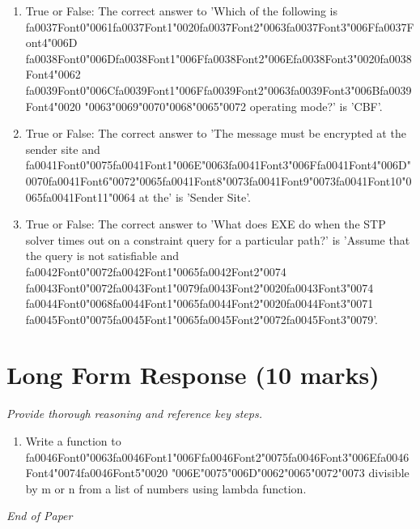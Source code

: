 \documentclass[12pt]{article}
\begin{document}
\begin{enumerate}[label=\arabic*.]
\item True or False: The correct answer to 'Which of the following is {\csname fa0037Font0\endcsname\char"0061}{\csname fa0037Font1\endcsname\char"0020}{\csname fa0037Font2\endcsname\char"0063}{\csname fa0037Font3\endcsname\char"006F}{\csname fa0037Font4\endcsname\char"006D} {\csname fa0038Font0\endcsname\char"006D}{\csname fa0038Font1\endcsname\char"006F}{\csname fa0038Font2\endcsname\char"006E}{\csname fa0038Font3\endcsname\char"0020}{\csname fa0038Font4\endcsname\char"0062} {\csname fa0039Font0\endcsname\char"006C}{\csname fa0039Font1\endcsname\char"006F}{\csname fa0039Font2\endcsname\char"0063}{\csname fa0039Font3\endcsname\char"006B}{\csname fa0039Font4\endcsname\char"0020} {\char"0063}{\char"0069}{\char"0070}{\char"0068}{\char"0065}{\char"0072} operating mode?' is 'CBF'.
\item True or False: The correct answer to 'The message must be encrypted at the sender site and {\csname fa0041Font0\endcsname\char"0075}{\csname fa0041Font1\endcsname\char"006E}{\char"0063}{\csname fa0041Font3\endcsname\char"006F}{\csname fa0041Font4\endcsname\char"006D}{\char"0070}{\csname fa0041Font6\endcsname\char"0072}{\char"0065}{\csname fa0041Font8\endcsname\char"0073}{\csname fa0041Font9\endcsname\char"0073}{\csname fa0041Font10\endcsname\char"0065}{\csname fa0041Font11\endcsname\char"0064} at the' is 'Sender Site'.
\item True or False: The correct answer to 'What does EXE do when the STP solver times out on a constraint query for a particular path?' is 'Assume that the query is not satisfiable and {\csname fa0042Font0\endcsname\char"0072}{\csname fa0042Font1\endcsname\char"0065}{\csname fa0042Font2\endcsname\char"0074} {\csname fa0043Font0\endcsname\char"0072}{\csname fa0043Font1\endcsname\char"0079}{\csname fa0043Font2\endcsname\char"0020}{\csname fa0043Font3\endcsname\char"0074} {\csname fa0044Font0\endcsname\char"0068}{\csname fa0044Font1\endcsname\char"0065}{\csname fa0044Font2\endcsname\char"0020}{\csname fa0044Font3\endcsname\char"0071} {\csname fa0045Font0\endcsname\char"0075}{\csname fa0045Font1\endcsname\char"0065}{\csname fa0045Font2\endcsname\char"0072}{\csname fa0045Font3\endcsname\char"0079}'.
\end{enumerate}

\section*{Long Form Response (10 marks)}
\textit{Provide thorough reasoning and reference key steps.}
\begin{enumerate}[label=\arabic*.]
\item Write a function to {\csname fa0046Font0\endcsname\char"0063}{\csname fa0046Font1\endcsname\char"006F}{\csname fa0046Font2\endcsname\char"0075}{\csname fa0046Font3\endcsname\char"006E}{\csname fa0046Font4\endcsname\char"0074}{\csname fa0046Font5\endcsname\char"0020} {\char"006E}{\char"0075}{\char"006D}{\char"0062}{\char"0065}{\char"0072}{\char"0073} divisible by m or n from a list of numbers using lambda
function.
\end{enumerate}

\vfill
\noindent\textit{End of Paper}
\end{document}

